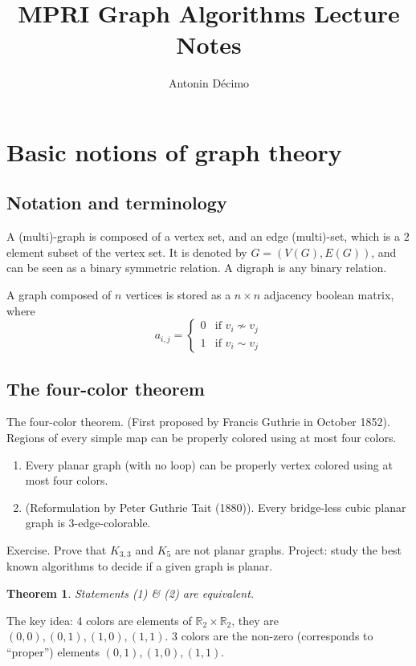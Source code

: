 \documentclass[12pt,a4paper]{article}
\title{MPRI Graph Algorithms Lecture Notes}
\author{Antonin Décimo}
\def\Z{\mathbb{R}}
\newtheorem{theorem}{Theorem}
\begin{document}
\maketitle

\section{Basic notions of graph theory}

\subsection{Notation and terminology}

A (multi)-graph is composed of a vertex set, and an edge (multi)-set, which is a
\(2\) element subset of the vertex set.  It is denoted by \(G = (V(G), E(G))\),
and can be seen as a binary symmetric relation.  A digraph is any binary
relation.

A graph composed of \(n\) vertices is stored as a \(n \times n\) adjacency
boolean matrix, where
\[a_{i, j} = \begin{cases}
    0 & \text{if } v_i \not\sim v_j\\
    1 & \text{if } v_i \sim v_j
  \end{cases}\]

\subsection{The four-color theorem}
The four-color theorem. (First proposed by Francis Guthrie in October 1852).
Regions of every simple map can be properly colored using at most four colors.

\begin{enumerate}
\item Every planar graph (with no loop) can be properly vertex colored using at
most four colors.
\item (Reformulation by Peter Guthrie Tait (1880)). Every bridge-less cubic
  planar graph is 3-edge-colorable.
\end{enumerate}

Exercise. Prove that \(K_{3,3}\) and \(K_5\) are not planar graphs.  Project:
study the best known algorithms to decide if a given graph is planar.

\begin{theorem}
  Statements (1) \& (2) are equivalent.
\end{theorem}

The key idea: 4 colors are elements of \(\Z_2 \times \Z_2\), they are
\((0, 0), (0, 1), (1, 0), (1, 1)\).  3 colors are the non-zero (corresponds to
\enquote{proper}) elements \((0, 1), (1, 0), (1, 1)\).
\end{document}
